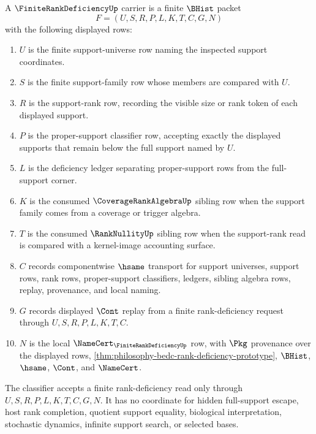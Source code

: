 \begin{definition}
\label{def:finite-rank-deficiency-carrier}
A $\FiniteRankDeficiencyUp$ carrier is a finite $\BHist$ packet
$$
F=(U,S,R,P,L,K,T,C,G,N)
$$
with the following displayed rows:
\begin{enumerate}
\item $U$ is the finite support-universe row naming the inspected support coordinates.
\item $S$ is the finite support-family row whose members are compared with $U$.
\item $R$ is the support-rank row, recording the visible size or rank token of each displayed support.
\item $P$ is the proper-support classifier row, accepting exactly the displayed supports that remain below the full support named by $U$.
\item $L$ is the deficiency ledger separating proper-support rows from the full-support corner.
\item $K$ is the consumed $\CoverageRankAlgebraUp$ sibling row when the support family comes from a coverage or trigger algebra.
\item $T$ is the consumed $\RankNullityUp$ sibling row when the support-rank read is compared with a kernel-image accounting surface.
\item $C$ records componentwise $\hsame$ transport for support universes, support rows, rank rows, proper-support classifiers, ledgers, sibling algebra rows, replay, provenance, and local naming.
\item $G$ records displayed $\Cont$ replay from a finite rank-deficiency request through $U,S,R,P,L,K,T,C$.
\item $N$ is the local $\NameCert_{\FiniteRankDeficiencyUp}$ row, with $\Pkg$ provenance over the displayed rows, \autoref{thm:philosophy-bedc-rank-deficiency-prototype}, $\BHist$, $\hsame$, $\Cont$, and $\NameCert$.
\end{enumerate}
The classifier accepts a finite rank-deficiency read only through $U,S,R,P,L,K,T,C,G,N$. It has no coordinate for hidden full-support escape, host rank completion, quotient support equality, biological interpretation, stochastic dynamics, infinite support search, or selected bases.
\end{definition}

